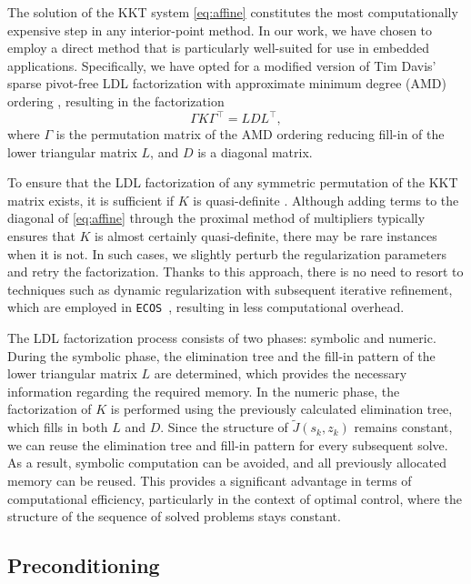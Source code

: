 \documentclass[letterpaper, 10 pt, conference]{ieeeconf}  \IEEEoverridecommandlockouts
\begin{document}
The solution of the KKT system \eqref{eq:affine} constitutes the most computationally expensive step in any interior-point method. In our work, we have chosen to employ a direct method that is particularly well-suited for use in embedded applications. Specifically, we have opted for a modified version of Tim Davis' sparse pivot-free LDL factorization \cite{davis2005} with approximate minimum degree (AMD) ordering \cite{amestoy2004}, resulting in the factorization
\begin{equation*}
\Gamma K\Gamma ^\top = LDL^\top,
\end{equation*}
where $\Gamma$ is the permutation matrix of the AMD ordering reducing fill-in of the lower triangular matrix $L$, and $D$ is a diagonal matrix.

To ensure that the LDL factorization of any symmetric permutation of the KKT matrix exists, it is sufficient if $K$ is quasi-definite \cite{vanderbei1995}. Although adding terms to the diagonal of \eqref{eq:affine} through the proximal method of multipliers typically ensures that $K$ is almost certainly quasi-definite, there may be rare instances when it is not. In such cases, we slightly perturb the regularization parameters and retry the factorization. Thanks to this approach, there is no need to resort to techniques such as dynamic regularization with subsequent iterative refinement, which are employed in \texttt{ECOS}~\cite{domahidi2013}, resulting in less computational overhead.

The LDL factorization process consists of two phases: symbolic and numeric. During the symbolic phase, the elimination tree and the fill-in pattern of the lower triangular matrix $L$ are determined, which provides the necessary information regarding the required memory. In the numeric phase, the factorization of $K$ is performed using the previously calculated elimination tree, which fills in both $L$ and $D$. Since the structure of $\tilde J(s_k,z_k)$ remains constant, we can reuse the elimination tree and fill-in pattern for every subsequent solve. As a result, symbolic computation can be avoided, and all previously allocated memory can be reused. This provides a significant advantage in terms of computational efficiency, particularly in the context of optimal control, where the structure of the sequence of solved problems stays constant.

\subsection{Preconditioning}
\end{document}

